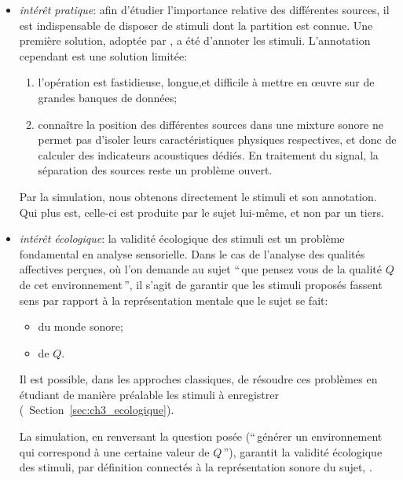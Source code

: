 \begin{itemize}
\item \emph{intérêt pratique}: afin d'étudier l'importance relative des différentes sources, il est indispensable de disposer de stimuli dont la partition est connue. Une première solution, adoptée par \citep{lavandier2006contribution}, a été d'annoter les stimuli. L'annotation cependant est une solution limitée: 
\begin{enumerate}
\item l'opération est fastidieuse, longue,et difficile à mettre en œuvre sur de grandes banques de données;
\item connaître la position des différentes sources dans une mixture sonore ne permet pas d'isoler leurs caractéristiques physiques respectives, et donc de calculer des indicateurs acoustiques dédiés. En traitement du signal, la séparation des sources reste un problème ouvert.
\end{enumerate}

Par la simulation, nous obtenons directement le stimuli et son annotation. Qui plus est, celle-ci est produite par le sujet lui-même, et non par un tiers. 

\item \emph{intérêt écologique}: la validité écologique des stimuli est un problème fondamental en analyse sensorielle. Dans le cas de l'analyse des qualités affectives perçues, où l'on demande au sujet ``\,que pensez vous de la qualité $Q$ de cet environnement\,'', il s'agit de garantir que les stimuli proposés fassent sens par rapport à la représentation mentale que le sujet se fait: 

\begin{itemize}
\item  du monde sonore; 
\item  de $Q$. 
\end{itemize}

Il est possible, dans les approches classiques, de résoudre ces problèmes en étudiant de manière préalable les stimuli à enregistrer (\cf~Section~\ref{sec:ch3_ecologique}). 

La simulation, en renversant la question posée (``\,générer un environnement qui correspond à une certaine valeur de $Q$\,''), garantit la validité écologique des stimuli, par définition connectés à la représentation sonore du sujet, .


\end{itemize}
